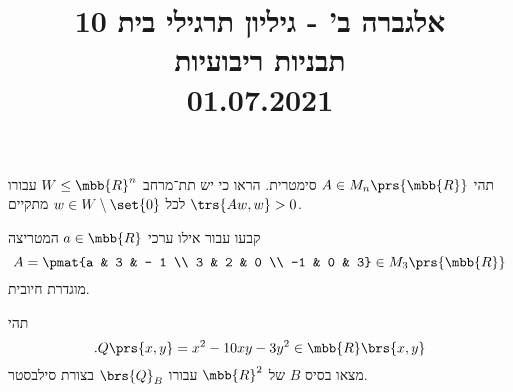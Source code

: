 \documentclass[a4paper,10pt,twoside,openany]{article}
\title{
אלגברה ב' - גיליון תרגילי בית 10 \\
תבניות ריבועיות
\\
\small{01.07.2021}
}
\date{}
\begin{document}
\maketitle

\begin{exercise}
תהי
$A \in M_n\prs{\mbb{R}}$
סימטרית. הראו כי יש תת־מרחב
$W \leq \mbb{R}^n$
עבורו לכל
$w \in W \setminus \set{0}$
מתקיים
$\trs{Aw, w} > 0$.
\end{exercise}

\begin{exercise}
קבעו עבור אילו ערכי
$a \in \mbb{R}$
המטריצה
\[A = \pmat{a & 3 & - 1 \\ 3 & 2 & 0 \\ -1 & 0 & 3} \in M_3\prs{\mbb{R}}\]
מוגדרת חיובית.
\end{exercise}

\begin{exercise}
תהי
\[\text{.} Q\prs{x,y} = x^2 - 10xy - 3y^2 \in \mbb{R}\brs{x,y}\]
מצאו בסיס
$B$
של
$\mbb{R}^2$
עבורו
$\brs{Q}_B$
בצורת סילבסטר.
\end{exercise}
\end{document}
